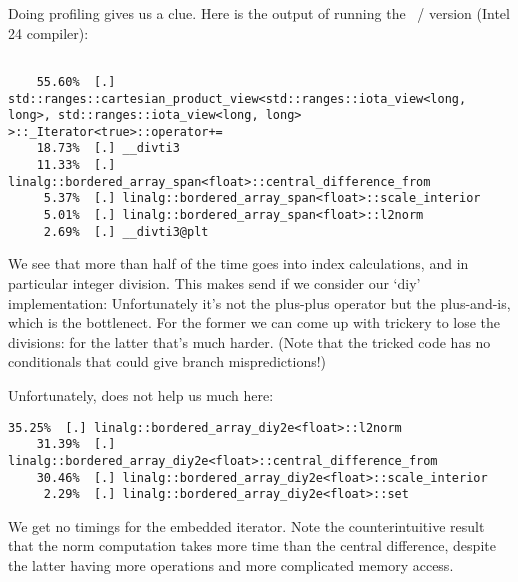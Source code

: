 Doing profiling gives us a clue.
Here is the output of running the ~/ 
version (Intel 24 compiler):
\begin{lstlisting}[language=verbatim]
%% make run_perf VARIANTS=span NSIZE=10000 ECHO=1  

    55.60%  [.] std::ranges::cartesian_product_view<std::ranges::iota_view<long, long>, std::ranges::iota_view<long, long> >::_Iterator<true>::operator+=
    18.73%  [.] __divti3
    11.33%  [.] linalg::bordered_array_span<float>::central_difference_from
     5.37%  [.] linalg::bordered_array_span<float>::scale_interior
     5.01%  [.] linalg::bordered_array_span<float>::l2norm
     2.69%  [.] __divti3@plt
\end{lstlisting}
We see that more than half of the time goes into index calculations,
and in particular integer division.
This makes send if we consider our `diy' implementation:
Unfortunately it's not the plus-plus operator but the plus-and-is,
which is the bottlenect.
For the former we can come up with trickery to lose the divisions:
for the latter that's much harder.
(Note that the tricked code has no conditionals that could give branch mispredictions!)

Unfortunately,  does not help us much here:
\begin{lstlisting}[language=verbatim]
    35.25%  [.] linalg::bordered_array_diy2e<float>::l2norm
    31.39%  [.] linalg::bordered_array_diy2e<float>::central_difference_from
    30.46%  [.] linalg::bordered_array_diy2e<float>::scale_interior
     2.29%  [.] linalg::bordered_array_diy2e<float>::set
\end{lstlisting}
We get no timings for the embedded iterator.
Note the counterintuitive result that the norm computation takes more time than the
central difference,
despite the latter having more operations
and more complicated memory access.

\endinput


First of all we remark that ranging over data:
\begin{multicols}{2}
\begin{lstlisting}
#pragma omp parallel for 
for ( int i=0; i<x.size(); ++i )
  x[i] = f(i);
\end{lstlisting}
\columnbreak
\begin{lstlisting}
#pragma omp parallel for 
for ( auto& [i,e] : 
        x | rv::enumerate )
  e = f(i);
\end{lstlisting}
\end{multicols}
comes with zero performance penalty.

